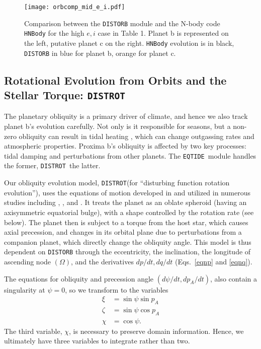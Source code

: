 \documentclass[preprint,12pt]{aastex}
\def\distorb{\texttt{\footnotesize{DISTORB}}\xspace}
\def\distrot{\texttt{\footnotesize{DISTROT}}\xspace}
\def\eqtide{\texttt{\footnotesize{EQTIDE}}\xspace}
\begin{document}
\begin{figure}
\texttt{[image: orbcomp\_mid\_e\_i.pdf]}
\caption{Comparison between the \distorb module and the N-body code
  {\footnotesize \texttt{HNBody}} for the high $e,i$ case in Table 1.
  Planet b is represented on the left, putative planet c on the
  right. {\footnotesize \texttt{HNBody}} evolution is in black,
  \distorb in blue for planet b, orange for planet c.}
\label{fig:orbitvalid}
\end{figure} 

\subsection{Rotational Evolution from Orbits and the Stellar Torque: \distrot}
\label{sec:models:distrot}
The planetary obliquity is a primary driver of climate, and hence we
also track planet b's evolution carefully. Not only is it responsible
for seasons, but a non-zero obliquity can result in tidal heating
\citep{Heller11}, which can change outgassing rates and atmospheric
properties. Proxima b's obliquity is affected by two key processes:
tidal damping and perturbations from other planets. The \eqtide~module
handles the former, \distrot~the latter.

Our obliquity evolution model, \distrot (for ``disturbing function
rotation evolution''), uses the equations of motion developed in
\cite{Kinoshita1975, Kinoshita1977} and utilized in numerous studies
including \cite{Laskar1986}, \cite{Laskar1993a,Laskar1993b}, and
\cite{Armstrong14}.  It treats the planet as an oblate spheroid
(having an axisymmetric equatorial bulge), with a shape controlled by
the rotation rate (see below). The planet then is subject to a torque
from the host star, which causes axial precession, and changes in its
orbital plane due to perturbations from a companion planet, which
directly change the obliquity angle.  This model is thus dependent on
\distorb through the eccentricity, the inclination, the longitude of
ascending node $(\Omega)$, and the derivatives $dp/dt, dq/dt$
(Eqs.~\ref{eqnp} and \ref{eqnq}).

The equations for obliquity and precession angle $(d\psi/dt,
dp_A/dt)$, also contain a singularity at $\psi = 0$, so we transform
to the variables
\begin{align}
\xi & = \sin{\psi} \sin{p_A} \\
\zeta & = \sin{\psi} \cos{p_A} \\
\chi & = \cos{\psi}.
\end{align}
The third variable, $\chi$, is necessary to preserve domain
information. Hence, we ultimately have three variables to integrate
rather than two.
\end{document}
